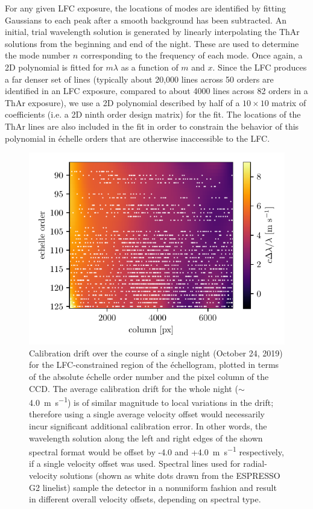 For any given LFC exposure, the locations of modes are identified by fitting Gaussians to each peak after a smooth background has been subtracted. An initial, trial wavelength solution is generated by linearly interpolating the ThAr solutions from the beginning and end of the night. These are used to determine the mode number $n$ corresponding to the frequency of each mode. Once again, a 2D polynomial is fitted for $m\lambda$ as a function of $m$ and $x$. Since the LFC produces a far denser set of lines (typically about 20,000 lines across 50 orders are identified in an LFC exposure, compared to about 4000 lines across 82 orders in a ThAr exposure), we use a 2D polynomial described by half of a $10\times10$ matrix of coefficients (i.e. a 2D ninth order design matrix) for the fit. The locations of the ThAr lines are also included in the fit in order to constrain the behavior of this polynomial in \'echelle orders that are otherwise inaccessible to the LFC.

\begin{figure}[htbp]
    \centering
    \includegraphics{figures-4/drift.pdf}
    \caption[EXPRES wavelength calibration drift]{Calibration drift over the course of a single night (October 24, 2019) for the LFC-constrained region of the \'echellogram, plotted in terms of the absolute \'echelle order number and the pixel column of the CCD. The average calibration drift for the whole night ($\sim$4.0~\si{\meter\per\second}) is of similar magnitude to local variations in the drift; therefore using a single average velocity offset would necessarily incur significant additional calibration error. In other words, the wavelength solution along the left and right edges of the shown spectral format would be offset by -4.0 and +4.0~\si{\meter\per\second} respectively, if a single velocity offset was used. Spectral lines used for radial-velocity solutions (shown as white dots drawn from the ESPRESSO G2 linelist) sample the detector in a nonuniform fashion and result in different overall velocity offsets, depending on spectral type.}
    \label{fig:caldrift}
\end{figure}

